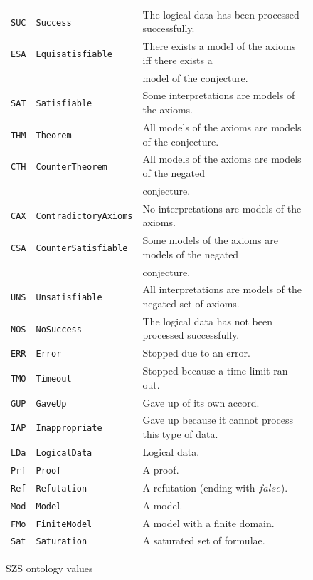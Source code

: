 \documentclass{easychair}
\begin{document}
\begin{figure}[htb]
\centering
\begin{tabular}{lll}
\hline
{\tt SUC} & {\tt Success}             & 
The logical data has been processed successfully. \\
{\tt ESA} & {\tt Equisatisfiable}     & 
There exists a model of the axioms iff there exists a \\
          &                           & model of the conjecture.\\
{\tt SAT} & {\tt Satisfiable}         & 
Some interpretations are models of the axioms.\\
{\tt THM} & {\tt Theorem}             & 
All models of the axioms are models of the conjecture.\\
{\tt CTH} & {\tt CounterTheorem}      & 
All models of the axioms are models of the negated \\
          &                           & conjecture.\\
{\tt CAX} & {\tt ContradictoryAxioms} & 
No interpretations are models of the axioms.\\
{\tt CSA} & {\tt CounterSatisfiable}  & 
Some models of the axioms are models of the negated \\
          &                           & conjecture.\\
{\tt UNS} & {\tt Unsatisfiable}       & 
All interpretations are models of the negated set of axioms.\\
\hline
{\tt NOS} & {\tt NoSuccess}           & 
The logical data has not been processed successfully. \\
{\tt ERR} & {\tt Error}               & 
Stopped due to an error. \\
{\tt TMO} & {\tt Timeout}             & 
Stopped because a time limit ran out. \\
{\tt GUP} & {\tt GaveUp}              & 
Gave up of its own accord. \\
{\tt IAP} & {\tt Inappropriate}       & 
Gave up because it cannot process this type of data. \\
\hline
{\tt LDa} & {\tt LogicalData}         & 
Logical data. \\
{\tt Prf} & {\tt Proof}               & 
A proof. \\
{\tt Ref} & {\tt Refutation}          & 
A refutation (ending with $false$). \\
{\tt Mod} & {\tt Model}               & 
A model. \\
{\tt FMo} & {\tt FiniteModel}         & 
A model with a finite domain. \\
{\tt Sat} & {\tt Saturation}          & 
A saturated set of formulae. \\
\hline
\end{tabular}
\caption{SZS ontology values}
\label{SZSTable}
\end{figure} 
\end{document}
